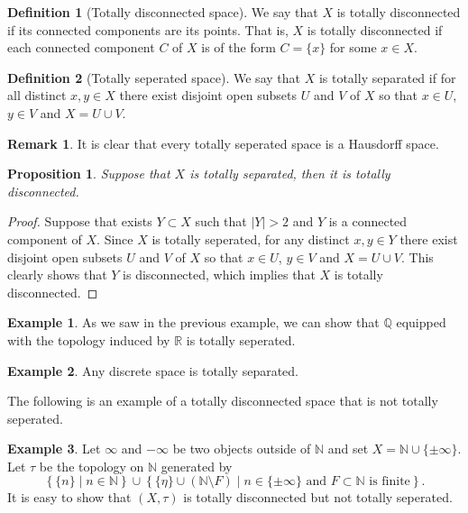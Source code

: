 \documentclass[11pt,a4paper]{article}
\theoremstyle{definition}
\newtheorem{definition}{Definition}[section]
\newtheorem{remark}{Remark}[section]
\newtheorem{example}{Example}[section]
\theoremstyle{plain}
\newtheorem{proposition}[theorem]{Proposition}
\newcommand{\N}{\mathbb{N}}
\newcommand{\Q}{\mathbb{Q}}
\newcommand{\R}{\mathbb{R}}
\newcommand{\set}[2]{ \left\{ #1 \mid #2 \right\} }
\begin{document}
  \begin{definition}[Totally disconnected space]
    We say that $X$ is totally disconnected if its connected components
    are its points.
    That is, $X$ is totally disconnected if each connected component $C$
    of $X$ is of the form $C = \{x\}$ for some $x \in X$.
  \end{definition}

  \begin{definition}[Totally seperated space]
    We say that $X$ is totally separated if for all distinct $x, y \in X$
    there exist disjoint open subsets $U$ and $V$ of $X$ so that 
    $x \in U$, $y \in V$ and $X = U \cup V$.
  \end{definition}

  \begin{remark}
    It is clear that every totally seperated space is a Hausdorff space.
  \end{remark}

  \begin{proposition}
    Suppose that $X$ is totally separated, then it is totally disconnected.
  \end{proposition}
  \begin{proof}
    Suppose that exists $Y \subset X$ such that $|Y| > 2$ and
    $Y$ is a connected component of $X$.
    Since $X$ is totally seperated, for any distinct $x, y \in Y$ there
    exist disjoint open subsets $U$ and $V$ of $X$ so that 
    $x \in U$, $y \in V$ and $X = U \cup V$.
    This clearly shows that $Y$ is disconnected, which implies that $X$ is
    totally disconnected.
  \end{proof}

  \begin{example}
    As we saw in the previous example, we can show that $\Q$ equipped with the
    topology induced by $\R$ is totally seperated.
  \end{example}
  \begin{example}
    Any discrete space is totally separated.
  \end{example}

  The following is an example of a totally disconnected space that is not
  totally seperated.

  \begin{example}
    Let $\infty$ and $-\infty$ be two objects outside of $\N$ and set
    $X = \N \cup\{\pm \infty\}$. Let $\tau$ be the topology on $\N$
    generated by
    \[
      \set{\{n\}}{n \in \N} \cup \set{\{\eta\} \cup (\N \setminus F)}
      {n \in \{\pm \infty\} \text{ and $F \subset \N$ is finite}}.
    \]
    It is easy to show that $(X, \tau)$ is totally disconnected but not
    totally seperated. 
  \end{example}
\end{document}
